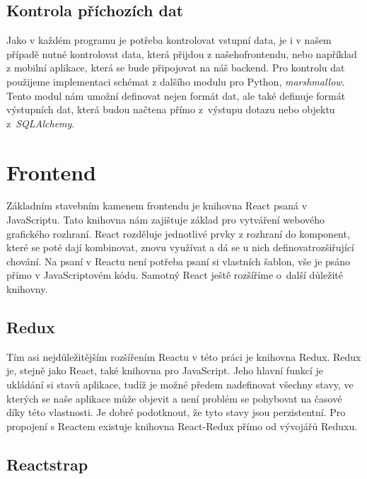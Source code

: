 \clearpage

\subsection{Kontrola příchozích dat}

Jako v každém programu je potřeba kontrolovat vstupní data, je i v našem případě nutné kontrolovat data, která přijdou z našeho\linebreak frontendu, nebo například z mobilní aplikace,
která se bude připojovat na náš backend. Pro kontrolu dat použijeme implementaci schémat z dalšího modulu pro Python, \textit{marshmallow}. Tento modul nám umožní definovat
nejen formát dat, ale také definuje formát výstupních dat, která budou načtena přímo z~výstupu dotazu nebo objektu z~\textit{SQLAlchemy}.

\section{Frontend}

Základním stavebním kamenem frontendu je knihovna React psaná v JavaScriptu. Tato knihovna nám zajištuje základ pro vytváření webového grafického rozhraní. React rozděluje
jednotlivé prvky z rozhraní do komponent, které se poté dají kombinovat, znovu využívat a dá se u nich definovat\linebreak rozšiřující chování. Na psaní v Reactu není potřeba psaní
si vlastních šablon, vše je psáno přímo v JavaScriptovém kódu. \cite{reactJS} Samotný React ještě rozšíříme o~další důležité knihovny.

\subsection{Redux}

Tím asi nejdůležitějším rozšířením Reactu v této práci je knihovna Redux. Redux je, stejně jako React, také knihovna pro JavaScript. Jeho hlavní funkcí je
ukládání si stavů aplikace, tudíž je možné předem nadefinovat všechny stavy, ve kterých se naše aplikace může objevit a není problém se pohybovat na časové
díky této vlastnosti. Je dobré podotknout, že tyto stavy jsou perzistentní. Pro propojení s Reactem existuje knihovna React-Redux přímo od vývojářů Reduxu. \cite{redux}

\subsection{Reactstrap}


